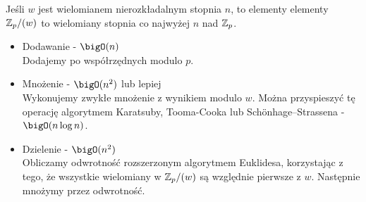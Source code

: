 Jeśli \( w \) jest wielomianem nierozkładalnym stopnia \( n \), to elementy 
elementy \( \mathbb{Z}_p/(w) \) to wielomiany stopnia co najwyżej \( n \) nad \( \mathbb{Z}_p \).
\begin{itemize}
    \item Dodawanie - \( \bigO(n) \) \\
    Dodajemy po współrzędnych modulo \( p \).
    \item Mnożenie - \( \bigO(n^2) \) lub lepiej \\
    Wykonujemy zwykłe mnożenie z wynikiem modulo \( w \). Można przyspieszyć tę operację algorytmem Karatsuby, Tooma-Cooka lub Sch\"onhage–Strassena - \( \bigO(n\log n) \).
    \item Dzielenie - \( \bigO(n^2) \) \\
    Obliczamy odwrotność rozszerzonym algorytmem Euklidesa, korzystając z tego, że wszystkie wielomiany w \( \mathbb{Z}_p/(w) \) są względnie pierwsze z \( w \). Następnie mnożymy przez odwrotność.
\end{itemize}
